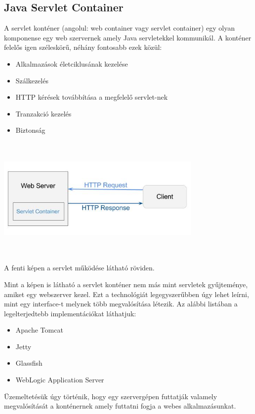 \documentclass{article}
\begin{document}
\subsection{Java Servlet Container}\label{subsec:java_servlet}
A servlet konténer (angolul: web container vagy servlet container) egy olyan komponense egy web szervernek amely Java servletekkel kommunikál. A konténer felelős igen széleskörű, néhány fontosabb ezek közül:
\begin{itemize}
	\item Alkalmazások életciklusának kezelése
	\item Szálkezelés
	\item HTTP kérések továbbítása a megfelelő servlet-nek
	\item Tranzakció kezelés
	\item Biztonság
\end{itemize} 
\begin{center}
	\includegraphics[width=10cm, height=6cm]{web-server-servlet-container}
	
	A fenti képen a servlet működése látható röviden.
\end{center}

Mint a képen is látható a servlet konténer nem más mint servletek gyűjteménye, amiket egy webszerver kezel. Ezt a technológiát legegyszerűbben úgy lehet leírni, mint egy interface-t melynek több megvalósítása létezik. Az alábbi listában a legelterjedtebb implementációkat láthatjuk: 
\begin{itemize}
	\item Apache Tomcat
	\item Jetty
	\item Glassfish
	\item WebLogic Application Server
\end{itemize}
Üzemeltetésük úgy történik, hogy egy szervergépen futtatják valamely megvalósítását a konténernek amely futtatni fogja a webes alkalmazásunkat.
\end{document}
